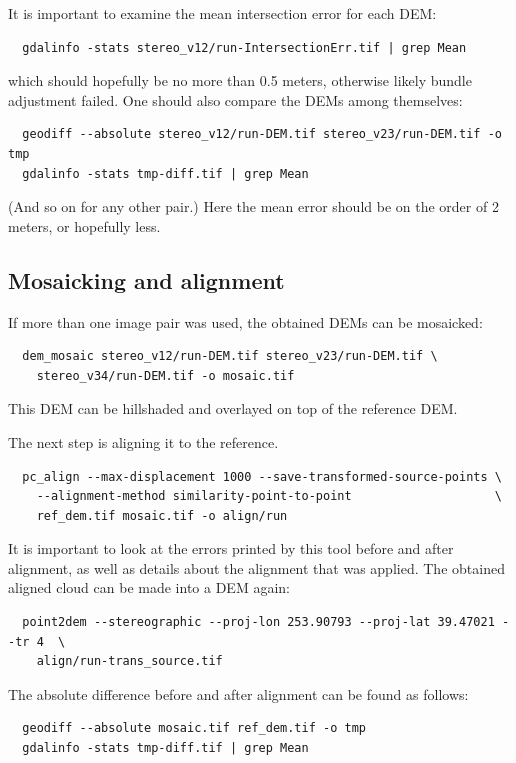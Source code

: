 It is important to examine the mean intersection error for each DEM:
\begin{verbatim}
  gdalinfo -stats stereo_v12/run-IntersectionErr.tif | grep Mean
\end{verbatim}

which should hopefully be no more than 0.5 meters, otherwise likely 
bundle adjustment failed. One should also compare the DEMs among themselves:
\begin{verbatim}
  geodiff --absolute stereo_v12/run-DEM.tif stereo_v23/run-DEM.tif -o tmp 
  gdalinfo -stats tmp-diff.tif | grep Mean
\end{verbatim}

(And so on for any other pair.) 
Here the mean error should be on the order of 2 meters, or hopefully less. 

\subsection{Mosaicking and alignment}

If more than one image pair was used, the obtained DEMs can be mosaicked:

\begin{verbatim}
  dem_mosaic stereo_v12/run-DEM.tif stereo_v23/run-DEM.tif \
    stereo_v34/run-DEM.tif -o mosaic.tif
\end{verbatim}

This DEM can be hillshaded and overlayed on top of the 
reference DEM.

The next step is aligning it to the reference. 
\begin{verbatim}
  pc_align --max-displacement 1000 --save-transformed-source-points \
    --alignment-method similarity-point-to-point                    \
    ref_dem.tif mosaic.tif -o align/run
\end{verbatim}

It is important to look at the errors printed by this tool
before and after alignment, as well as details about the alignment
that was applied. The obtained aligned cloud can be made into a DEM again:

\begin{verbatim}
  point2dem --stereographic --proj-lon 253.90793 --proj-lat 39.47021 --tr 4  \
    align/run-trans_source.tif
\end{verbatim}

The absolute difference before and after alignment can be found as 
follows:

\begin{verbatim}
  geodiff --absolute mosaic.tif ref_dem.tif -o tmp 
  gdalinfo -stats tmp-diff.tif | grep Mean
\end{verbatim}

